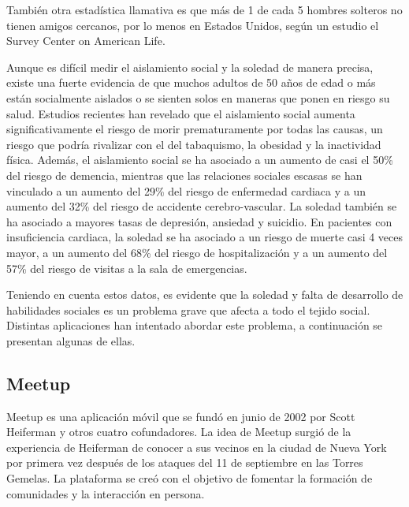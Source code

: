 También otra estadística llamativa es que más de 1 de cada 5 hombres solteros no tienen amigos cercanos, 
por lo menos en Estados Unidos, según un estudio el Survey Center on American Life\cite{REF14}.

Aunque es difícil medir el aislamiento social y la soledad de manera precisa, existe una fuerte evidencia de que muchos adultos de 50 años de edad o más están socialmente aislados 
o se sienten solos en maneras que ponen en riesgo su salud. 
Estudios recientes han revelado que el aislamiento social aumenta significativamente el riesgo de morir prematuramente por todas las causas, 
un riesgo que podría rivalizar con el del tabaquismo, la obesidad y la inactividad física. Además, el aislamiento social se ha asociado a un aumento de casi el 50\% del 
riesgo de demencia, mientras que las relaciones sociales escasas se han vinculado a un aumento del 29\% del riesgo de enfermedad cardiaca y a un 
aumento del 32\% del riesgo de accidente cerebro-vascular. La soledad también se ha asociado a mayores tasas de depresión, ansiedad y suicidio. 
En pacientes con insuficiencia cardiaca, la soledad se ha asociado a un riesgo de muerte casi 4 veces mayor, a un aumento del 68\% del riesgo de hospitalización y 
a un aumento del 57\% del riesgo de visitas a la sala de emergencias.\cite{REF15}

Teniendo en cuenta estos datos, es evidente que la soledad y falta de desarrollo de habilidades sociales es un problema grave que afecta a todo el tejido social.
Distintas aplicaciones han intentado abordar este problema, a continuación se presentan algunas de ellas.


\subsection{Meetup}
Meetup es una aplicación móvil que se fundó en junio de 2002 por Scott Heiferman 
y otros cuatro cofundadores. La idea de Meetup surgió de la experiencia de Heiferman de 
conocer a sus vecinos en la ciudad de Nueva York por primera vez después de los 
ataques del 11 de septiembre en las Torres Gemelas. La plataforma se creó con el 
objetivo de fomentar la formación de comunidades y la interacción en persona. 

